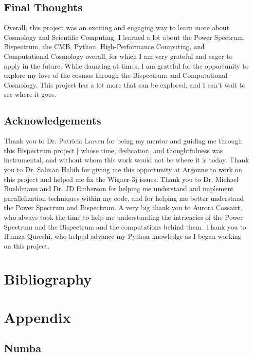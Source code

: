 \documentclass[11pt]{article}
\renewcommand{\_}[1]{\underline{ #1 }}
\begin{document}
{\subsection{Final Thoughts}\label{finalthoughts}

Overall, this project was an exciting and engaging way to learn more about Cosmology and Scientific Computing. I learned a lot about the Power Spectrum, Bispectrum, the CMB, Python, High-Performance Computing, and Computational Cosmology overall, for which I am very grateful and eager to apply in the future. While daunting at times, I am grateful for the opportunity to explore my love of the cosmos through the Bispectrum and Computational Cosmology. This project has a lot more that can be explored, and I can't wait to see where it goes.

\subsection{Acknowledgements}\label{acknowledgements}

Thank you to Dr. Patricia Larsen for being my mentor and guiding me through this Bispectrum project | whose time, dedication, and thoughtfulness was instrumental, and without whom this work would not be where it is today. Thank you to Dr. Salman Habib for giving me this opportunity at Argonne to work on this project and helped me fix the Wigner-3j issues. Thank you to Dr. Michael Buehlmann and Dr. JD Emberson for helping me understand and implement parallelization techniques within my code, and for helping me better understand the Power Spectrum and Bispectrum. A very big thank you to Aurora Cossairt, who always took the time to help me understanding the intricacies of the Power Spectrum and the Bispectrum and the computations behind them. Thank you to Humza Qureshi, who helped advance my Python knowledge as I began working on this project.

\section{Bibliography}



\section{Appendix}\label{appendix}

\subsection{Numba}\label{numba}

}
\end{document}
